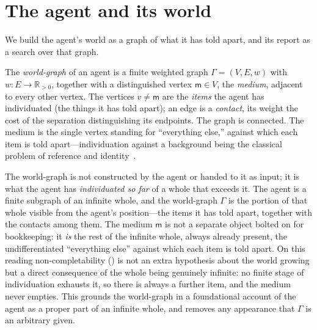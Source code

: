 \documentclass[11pt,twocolumn,a4paper]{article}
\newcommand{\R}{\mathbb{R}}
\newcommand{\Gph}{\Gamma}
\newcommand{\V}{V}
\newcommand{\E}{E}
\newcommand{\wt}{w}
\newcommand{\med}{\mathsf{m}}
\begin{document}
\section{The agent and its world}
\label{sec:world}

We build the agent's world as a graph of what it has told apart, and its
report as a search over that graph.

\begin{definition}
\label{def:world}
The \emph{world-graph} of an agent is a finite weighted graph
$\Gph=(\V,\E,\wt)$ with $\wt:\E\to\R_{>0}$, together with a distinguished
vertex $\med\in\V$, the \emph{medium}, adjacent to every other vertex. The
vertices $v\neq\med$ are the \emph{items} the agent has individuated (the
things it has told apart); an edge is a \emph{contact}, its weight the cost
of the separation distinguishing its endpoints. The graph is connected. The
medium is the single vertex standing for ``everything else,'' against which
each item is told apart---individuation against a background being the
classical problem of reference and identity~\cite{quine1960,putnam1975}.
\end{definition}

\begin{remark}
\label{rem:infinitewhole}
The world-graph is not constructed by the agent or handed to it as input;
it is what the agent has \emph{individuated so far} of a whole that exceeds
it. The agent is a finite subgraph of an infinite whole, and the
world-graph $\Gph$ is the portion of that whole visible from the agent's
position---the items it has told apart, together with the contacts among
them. The medium $\med$ is not a separate object bolted on for bookkeeping:
it \emph{is} the rest of the infinite whole, always already present, the
undifferentiated ``everything else'' against which each item is told apart.
On this reading non-completability () is not an
extra hypothesis about the world growing but a direct consequence of the
whole being genuinely infinite: no finite stage of individuation exhausts
it, so there is always a further item, and the medium never empties. This
grounds the world-graph in a foundational account of the agent as a proper
part of an infinite whole, and removes any appearance that $\Gph$ is an
arbitrary given.
\end{remark}
\end{document}
